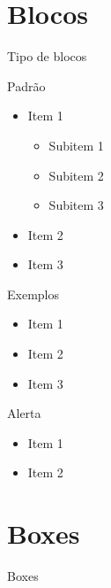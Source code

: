 \documentclass[table,xcolor=table]{apresentacoes/exemplo-2/IFMG-beamer}
\begin{document}
\section{Blocos}
\begin{frame}{Tipo de blocos}

\begin{block}{Padrão}
\begin{itemize}
  \item Item 1
  \begin{itemize}
      \item Subitem 1
      \item Subitem 2
      \item Subitem 3
  \end{itemize}
  \item Item 2
  \item Item 3
\end{itemize}
\end{block}

\pause

\begin{exampleblock}{Exemplos}
    \begin{itemize}
      \item Item 1
      \item Item 2
      \item Item 3
    \end{itemize}
\end{exampleblock}

\pause

\begin{alertblock}{Alerta}
    \begin{itemize}
      \item Item 1
       \item Item 2
    \end{itemize}
\end{alertblock}
\end{frame}

\section{Boxes}

\begin{frame}{Boxes}









\end{frame}
\end{document}
